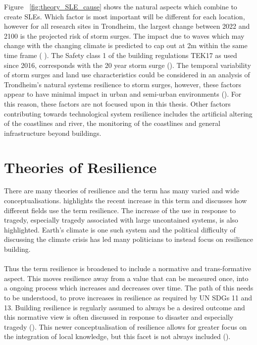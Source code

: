 Figure ~\ref{fig:theory_SLE_cause} shows the natural aspects which combine to create SLEs. Which factor is most important will be different for each location, however for all research sites in Trondheim, the largest change between 2022 and 2100 is the projected risk of storm surges. The impact due to waves which may change with the changing climate is predicted to cap out at 2m within the same time frame ( \cite{hanssen_saksframlegg_2013}). The Safety class 1 of the building regulations TEK17 as used since 2016, corresponds with the 20 year storm surge (\cite{kartverket_high_2022}). The temporal variability of storm surges and land use characteristics could be considered in an analysis of Trondheim's natural systems resilience to storm surges, however, these factors appear to have minimal impact in urban and semi-urban environments (\cite{hoffken_effects_2020}). For this reason, these factors are not focused upon in this thesis. Other factors contributing towards technological system resilience includes the artificial altering of the coastlines and river, the monitoring of the coastlines and general infrastructure beyond buildings.

\section{Theories of Resilience }

There are many theories of resilience and the term has many varied and wide conceptualisations. \cite{moser_turbulent_2019} highlights the recent increase in this term and discusses how different fields use the term resilience.  The increase of the use in response to tragedy, especially tragedy associated with large uncontained systems, is also highlighted. Earth's climate is one such system and the political difficulty of discussing the climate crisis has led many politicians to instead focus on resilience building. 
\paragraph{}

Thus the term resilience is broadened to include a normative and trans-formative aspect. This moves resilience away from a value that can be measured once, into a ongoing process which increases and decreases over time. The path of this needs to be understood, to prove increases in resilience as required by UN SDGs 11 and 13. Building resilience is regularly assumed to always be a desired outcome and this normative view is often discussed in response to disaster and especially tragedy (\cite{moser_turbulent_2019}). This newer conceptualisation of resilience allows for greater focus on the integration of local knowledge, but this facet is not always included (\cite{moser_turbulent_2019}).
